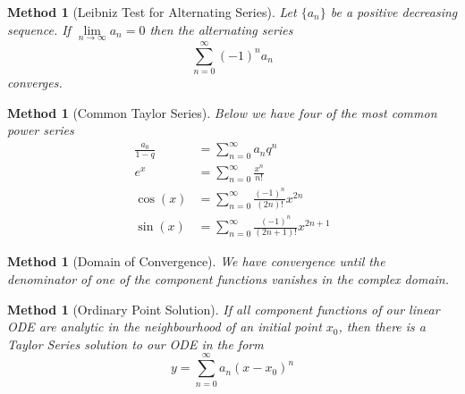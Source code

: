 \documentclass[12pt]{article}
\newtheorem{met}[thm]{Method}
\theoremstyle{definition}
\theoremstyle{remark}
\numberwithin{equation}{section}
\begin{document}
\vspace{1cm}


\begin{met}[Leibniz Test for Alternating Series]
        Let $\{a_n\}$ be a positive decreasing sequence. If $\lim\limits_{n\rightarrow \infty}a_n = 0$ then the alternating series \begin{equation}
                \sum\limits_{n=0}^{\infty}(-1)^na_n
        \end{equation}
        converges.
\end{met}

\vspace{1cm}


\begin{met}[Common Taylor Series]
        Below we have four of the most common power series \begin{align}
                \frac{a_0}{1-q} &= \sum\limits_{n=0}^{\infty}a_nq^n \\
                e^x &= \sum\limits_{n=0}^{\infty}\frac{x^n}{n!} \\
                \cos(x) &= \sum\limits_{n=0}^{\infty}\frac{(-1)^n}{(2n)!}x^{2n} \\
                \sin(x) &= \sum\limits_{n=0}^{\infty}\frac{(-1)^n}{(2n+1)!}x^{2n+1}
        \end{align}
\end{met}


\vspace{1cm}

\begin{met}[Domain of Convergence]
        We have convergence until the denominator of one of the component functions vanishes in the complex domain.
\end{met}

\vspace{1cm}


\begin{met}[Ordinary Point Solution]
        If all component functions of our linear ODE are analytic in the neighbourhood of an initial point $x_0$, then there is a Taylor Series solution to our ODE in the form \begin{equation}
                y = \sum\limits_{n=0}^{\infty}a_n(x-x_0)^n
        \end{equation}
\end{met}


\vspace{1cm}
\end{document}
